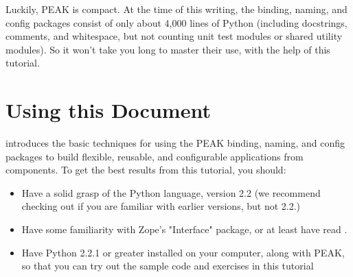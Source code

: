 Luckily, PEAK is compact. At the time of this writing, the binding,
naming, and config packages consist of only about 4,000 lines of Python
(including docstrings, comments, and whitespace, but not counting unit
test modules or shared utility modules). So it won't take you long to
master their use, with the help of this tutorial. 



\section{Using this Document}

 introduces
the basic techniques for using the PEAK binding, naming, and config
packages to build flexible, reusable, and configurable applications from
components. To get the best results from this tutorial, you should:

\begin{itemize}

\item Have a solid grasp of the Python language, version 2.2 (we
recommend checking out 
if you are familiar with earlier versions, but not 2.2.)

\item Have some familiarity with Zope's "Interface" package, or at least
have read .

\item Have Python 2.2.1 or greater installed on your computer, along
with PEAK, so that you can try out the sample code and exercises in this
tutorial

\end{itemize}


